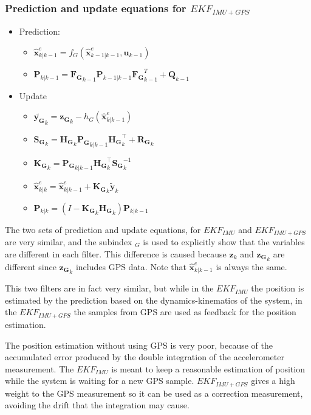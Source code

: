 \documentclass[conference]{IEEEtran}
\begin{document}
\subsubsection{Prediction and update equations for $EKF_{IMU+GPS}$}
\begin{itemize}
	\item Prediction:
	\begin{itemize}
		\item $\hat{\mathbf{x}}_{k|k-1}^e = f_{G}(\hat{\mathbf{x}}_{k-1|k-1}^e, \mathbf{u}_{k-1})$
		\item $ \mathbf{P}_{k|k-1} =  {{\mathbf{F_{G}}_{k-1}}} \mathbf{P}_{k-1|k-1}{  {\mathbf{F_{G}}_{k-1}^T}} + \mathbf{Q}_{k-1} $
	\end{itemize}
	\item Update
	\begin{itemize}
		\item $\mathbf{\tilde{y_G}}_{k} = \mathbf{z_{G}}_{k} - h_G(\hat{\mathbf{x}}_{k|k-1}^e)$
		\item $\mathbf{S_{G}}_{k} = { \mathbf{H_{G}}_{k}}\mathbf{P_{G}}_{k|k-1}{ \mathbf{H_{G}}_{k}^\top} + \mathbf{R_{G}}_{k}$
		\item $\mathbf{K_{G}}_{k} = \mathbf{P_{G}}_{k|k-1}{ \mathbf{H_{G}}_{k}^\top}\mathbf{S_{G}}_{k}^{-1} $
		\item $\hat{\mathbf{x}}_{k|k}^e = \hat{\mathbf{x}}_{k|k-1}^e + \mathbf{K_{G}}_{k}\tilde{\mathbf{y}}_{k} $
		\item $ \mathbf{P}_{k|k} = (I - \mathbf{K_{G}}_{k} { \mathbf{H_{G}}_{k}}) \mathbf{P}_{k|k-1} $
	\end{itemize}
\end{itemize}
The two sets of prediction and update equations, for $EKF_{IMU}$ and $EKF_{IMU+GPS}$ are very similar, and the subindex $_G$ is used to explicitly show that the variables are different in each filter. This difference is caused because $\mathbf{z}_{k}$ and $\mathbf{z_G}_{k}$ are different since $\mathbf{z_G}_{k}$ includes GPS data. Note that $\hat{\mathbf{x}}_{k|k-1}^e$ is always the same.

This two filters are in fact very similar, but while in the $EKF_{IMU}$ the position is estimated by the prediction based on the dynamics-kinematics of the system, in the $EKF_{IMU+GPS}$ the samples from GPS are used as feedback for the position estimation. 

The position estimation without using GPS is very poor, because of the accumulated error produced by the double integration of the accelerometer measurement. The $EKF_{IMU}$ is meant to keep a reasonable estimation of position while the system is waiting for a new GPS sample. $EKF_{IMU+GPS}$ gives a high weight to the GPS measurement so it can be used as a correction measurement, avoiding the drift that the integration may cause.
\end{document}
